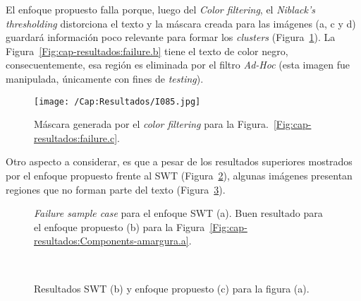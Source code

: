 El enfoque propuesto falla porque, luego del \textit{Color filtering}, el 
\textit{Niblack's thresholding} distorciona el texto y la máscara creada para
las imágenes (a, c y d) guardará información poco relevante para formar los
\textit{clusters} (Figura~\ref{Fig:cap-resultados:distortion}). La
Figura~\ref{Fig:cap-resultados:failure.b} tiene el texto de color negro,
consecuentemente, esa región es eliminada por el filtro \textit{Ad-Hoc} (esta
imagen fue manipulada, únicamente con fines de \textit{testing}).

\begin{figure}[h!]%
\centering
\texttt{[image: /Cap:Resultados/I085.jpg]}
\caption{Máscara generada por el \textit{color filtering} para la 
Figura.~\ref{Fig:cap-resultados:failure.c}.}
\label{Fig:cap-resultados:distortion}
\end{figure}


Otro aspecto a considerar, es que a pesar de los resultados superiores mostrados
por el enfoque propuesto frente al SWT (Figura~\ref{Fig:cap-resultados:good}),
algunas imágenes presentan regiones que no forman parte del texto
(Figura~\ref{Fig:cap-resultados:quite}).

\begin{figure}[ht]
\centering
\setlength{\fboxsep}{0pt}
 { }
\caption[Resultados SWT y enfoque propuesto - I]{\textit{Failure sample case} 
para el enfoque SWT (a). Buen resultado para el enfoque propuesto (b) para la 
Figura~\ref{Fig:cap-resultados:Components-amargura.a}.}
\label{Fig:cap-resultados:good}
\end{figure}

\begin{figure}[ht]%
\centering
\setlength{\fboxsep}{0pt}
\\
 { }
\caption[Resultados SWT y enfoque propuesto - II]{Resultados SWT (b) y enfoque 
propuesto (c) para la figura (a).}
\label{Fig:cap-resultados:quite}
\end{figure}

\clearpage

